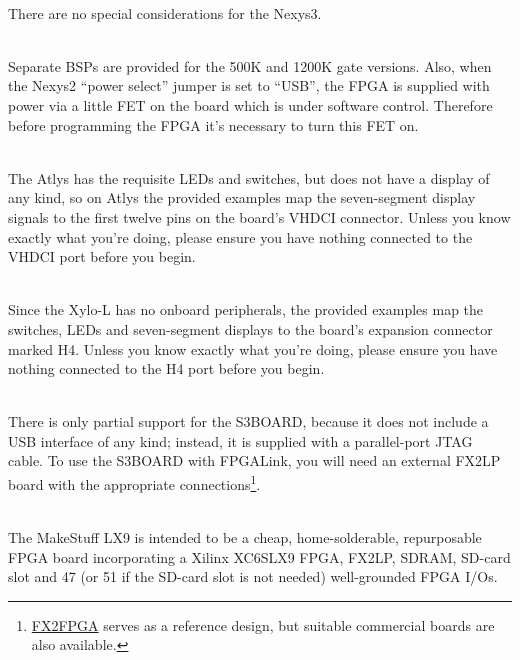 \begin{desc}
  \item[\sffamily{\href{http://www.digilentinc.com/Products/Detail.cfm?Prod=Nexys3}{Digilent Nexys3}:}] \hfill \\
    There are no special considerations for the Nexys3.
  \item[\sffamily{\href{http://www.digilentinc.com/Products/Detail.cfm?Prod=NEXYS2}{Digilent Nexys2 (500K \& 1200K versions)}:}] \hfill \\
    Separate BSPs are provided for the 500K and 1200K gate versions. Also, when the Nexys2 ``power select'' jumper is set to ``USB'', the FPGA is supplied with power via a little FET on the board which is under software control. Therefore before programming the FPGA it's necessary to turn this FET on.
  \item[\sffamily{\href{http://www.digilentinc.com/Products/Detail.cfm?Prod=ATLYS}{Digilent Atlys}:}] \hfill \\
    The Atlys has the requisite LEDs and switches, but does not have a display of any kind, so on Atlys the provided examples map the seven-segment display signals to the first twelve pins on the board's VHDCI connector. Unless you know exactly what you're doing, please ensure you have nothing connected to the VHDCI port before you begin.
  \item[\sffamily{\href{http://www.knjn.com/shop.html?pg=pic&src=images/Board_Xylo-L_details.jpg\&title=The\%20Xylo-L\%20board}{KNJN Xylo-L}:}] \hfill \\
    Since the Xylo-L has no onboard peripherals, the provided examples map the switches, LEDs and seven-segment displays to the board's expansion connector marked H4. Unless you know exactly what you're doing, please ensure you have nothing connected to the H4 port before you begin.
  \item[\sffamily{\href{http://www.digilentinc.com/Products/Detail.cfm?Prod=S3BOARD}{Digilent S3BOARD}:}] \hfill \\
    There is only partial support for the S3BOARD, because it does not include a USB interface of any kind; instead, it is supplied with a parallel-port JTAG cable. To use the S3BOARD with FPGALink, you will need an external FX2LP board with the appropriate connections\footnote{\href{http://www.makestuff.eu/wordpress/electronics/fx2fpga/}{FX2FPGA} serves as a reference design, but suitable commercial boards are also available.}.
  \item[\sffamily{\href{http://www.makestuff.eu/wordpress/electronics/lx9-fpga-board}{MakeStuff LX9}:}] \hfill \\
    The MakeStuff LX9 is intended to be a cheap, home-solderable, repurposable FPGA board incorporating a Xilinx XC6SLX9 FPGA, FX2LP, SDRAM, SD-card slot and 47 (or 51 if the SD-card slot is not needed) well-grounded FPGA I/Os.
\end{desc}

